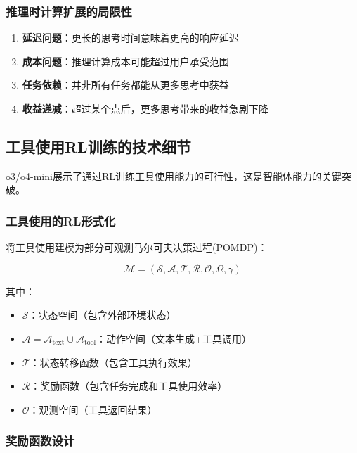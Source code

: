 \documentclass[12pt,a4paper]{article}
\begin{document}
\subsubsection{推理时计算扩展的局限性}

\begin{enumerate}
    \item \textbf{延迟问题}：更长的思考时间意味着更高的响应延迟
    \item \textbf{成本问题}：推理计算成本可能超过用户承受范围
    \item \textbf{任务依赖}：并非所有任务都能从更多思考中获益
    \item \textbf{收益递减}：超过某个点后，更多思考带来的收益急剧下降
\end{enumerate}

\subsection{工具使用RL训练的技术细节}

o3/o4-mini展示了通过RL训练工具使用能力的可行性，这是智能体能力的关键突破。

\subsubsection{工具使用的RL形式化}

将工具使用建模为部分可观测马尔可夫决策过程(POMDP)：

\begin{equation}
\mathcal{M} = (\mathcal{S}, \mathcal{A}, \mathcal{T}, \mathcal{R}, \mathcal{O}, \Omega, \gamma)
\end{equation}

其中：
\begin{itemize}
    \item $\mathcal{S}$：状态空间（包含外部环境状态）
    \item $\mathcal{A} = \mathcal{A}_{\text{text}} \cup \mathcal{A}_{\text{tool}}$：动作空间（文本生成+工具调用）
    \item $\mathcal{T}$：状态转移函数（包含工具执行效果）
    \item $\mathcal{R}$：奖励函数（包含任务完成和工具使用效率）
    \item $\mathcal{O}$：观测空间（工具返回结果）
\end{itemize}

\subsubsection{奖励函数设计}
\end{document}
